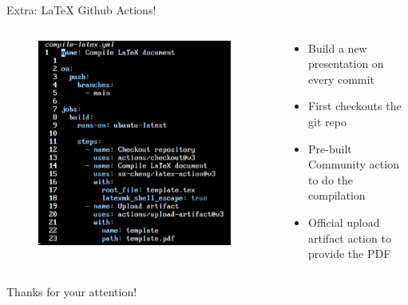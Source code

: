 \documentclass[compress,aspectratio=169]{beamer}
\begin{document}
  \begin{frame}{Extra: \LaTeX{} Github Actions!}
    \begin{columns}
      \begin{column}{0.5\textwidth}
        \begin{figure}
          \begin{center}
            \includegraphics[width=0.95\textwidth]{texaction.png}
          \end{center}
        \end{figure}
      \end{column}
      \begin{column}{0.5\textwidth}
        \begin{itemize}
                \item Build a new presentation on every commit
                \item First checkouts the git repo
                \item Pre-built Community action to do the compilation
                \item Official upload artifact action to provide the PDF
        \end{itemize}
      \end{column}
    \end{columns}
	\end{frame}

	\begin{frame}{}
		\label{pg:lastpage} %
    \begin{center}
    \Huge Thanks for your attention!
    \end{center}
	\end{frame}
\end{document}
